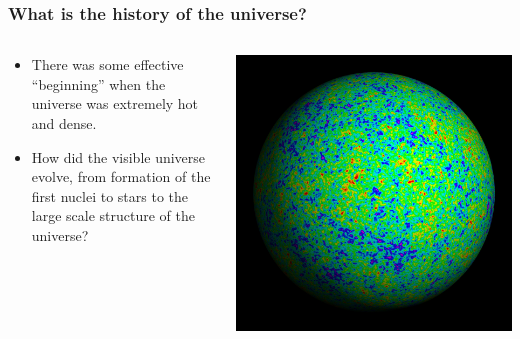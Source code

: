 \documentclass{beamer}
\begin{document}
\frame
{

    \frametitle{What is the history of the universe?}


    \begin{columns}
        \begin{column}{0.5\textwidth}
            \begin{itemize}

                \item There was some effective ``beginning'' when the universe
                    was extremely hot and dense.

                \item How did the visible universe evolve, from formation of
                    the first nuclei to stars to the large scale structure of
                    the universe?

            \end{itemize}
        \end{column}
        \begin{column}{0.5\textwidth}
            \begin{center}
                \includegraphics[width=\textwidth]{wiener3yr_map_2284x2284.jpg}
            \end{center}
        \end{column}
    \end{columns}


}
\end{document}
